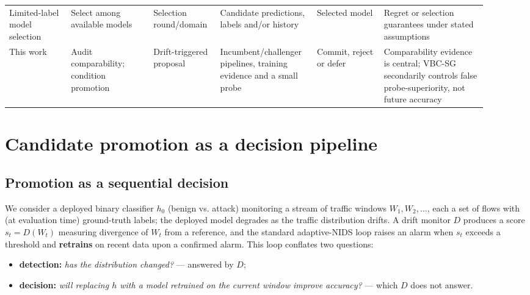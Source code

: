 \documentclass[a4paper,fleqn]{cas-sc}
\begin{document}
\begin{table}[t]
\begin{tabular}{p{0.12\linewidth} p{0.16\linewidth} p{0.12\linewidth} p{0.18\linewidth} p{0.13\linewidth} p{0.20\linewidth}}
Limited-label model selection \cite{karimi2021online,han2024model,okanovic2025models} & Select among available models & Selection round/domain & Candidate predictions, labels and/or history & Selected model & Regret or selection guarantees under stated assumptions \\
This work & Audit comparability; condition promotion & Drift-triggered proposal & Incumbent/challenger pipelines, training evidence and a small probe & Commit, reject or defer & Comparability evidence is central; VBC-SG secondarily controls false probe-superiority, not future accuracy \\
\bottomrule
\end{tabular}
\end{table}


\section{Candidate promotion as a decision pipeline}


\subsection{Promotion as a sequential decision}


We consider a deployed binary classifier $h_0$ (benign vs. attack) monitoring a stream of traffic windows $W_1, W_2, \dots$, each a set of flows with (at evaluation time) ground-truth labels; the deployed model degrades as the traffic distribution drifts. A drift monitor $D$ produces a score $s_t = D(W_t)$ measuring divergence of $W_t$ from a reference, and the standard adaptive-NIDS loop raises an alarm when $s_t$ exceeds a threshold and \textbf{retrains} on recent data upon a confirmed alarm. This loop conflates two questions:

\begin{itemize}
  \item \textbf{detection:} \emph{has the distribution changed?} --- answered by $D$;
  \item \textbf{decision:} \emph{will replacing $h$ with a model retrained on the current window improve accuracy?} --- which $D$ does not answer.
\end{itemize}
\end{document}
